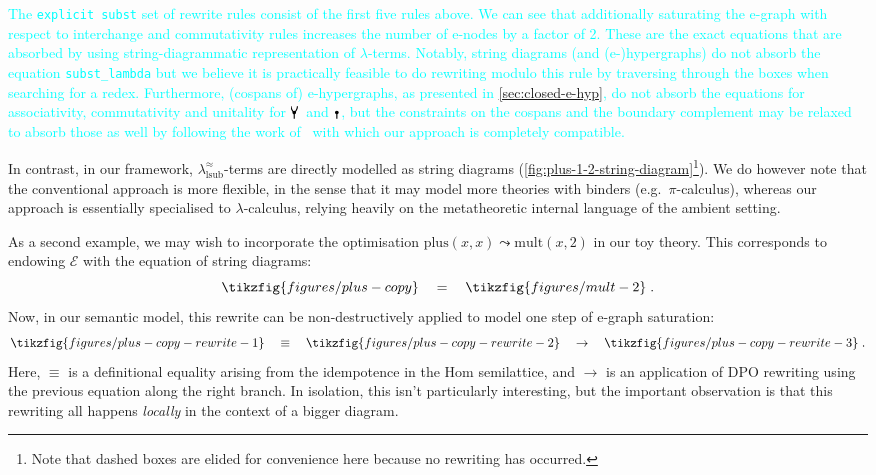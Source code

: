 \textcolor{cyan}{The \texttt{explicit subst} set of rewrite rules consist of the first five rules above.
	We can see that additionally saturating the e-graph with respect to interchange and commutativity rules increases the number of e-nodes by a factor of 2.
	These are the exact equations that are absorbed by using string-diagrammatic representation of $\lambda$-terms.
	Notably, string diagrams (and (e-)hypergraphs) do not absorb the equation \texttt{subst\_lambda} but we believe it is practically feasible to do rewriting modulo this rule by traversing through the boxes when searching for a redex.
	Furthermore, (cospans of) e-hypergraphs, as presented in \autoref{sec:closed-e-hyp}, do not absorb the equations for associativity, commutativity and unitality for $\comonoid$ and $\counit$, but the constraints on the cospans and the boundary complement may be relaxed to absorb those as well by following the work of~\cite{zanassi_comonoid} with which our approach is completely compatible.}

In contrast, in our framework, $\lambda^\approx_{\text{lsub}}$-terms are directly modelled as string diagrams (\autoref{fig:plus-1-2-string-diagram}\footnote{Note that dashed boxes are elided for convenience here because no rewriting has occurred.}).
We do however note that the conventional approach is more flexible, in the sense that it may model more theories with binders (e.g.\ $\pi$-calculus), whereas our approach is essentially specialised to $\lambda$-calculus, relying heavily on the metatheoretic internal language of the ambient setting.

As a second example, we may wish to incorporate the optimisation ${\text{plus} (x, x) \leadsto \text{mult} (x, 2)}$ in our toy theory.
This corresponds to endowing $\mathcal{E}$ with the equation of string diagrams:
\[
	\tikzfig{figures/plus-copy}
	\quad
	=
	\quad
	\tikzfig{figures/mult-2}
	\;
	.
\]
Now, in our semantic model, this rewrite can be non-destructively applied to model one step of e-graph saturation:
\[
	\tikzfig{figures/plus-copy-rewrite-1}
	\quad
	\equiv
	\quad
	\tikzfig{figures/plus-copy-rewrite-2}
	\quad
	\to
	\quad
	\tikzfig{figures/plus-copy-rewrite-3}
	\;
	.
\]
Here, $\equiv$ is a definitional equality arising from the idempotence in the Hom semilattice, and $\to$ is an application of DPO rewriting using the previous equation along the right branch.
In isolation, this isn't particularly interesting, but the important observation is that this rewriting all happens \emph{locally} in the context of a bigger diagram.

